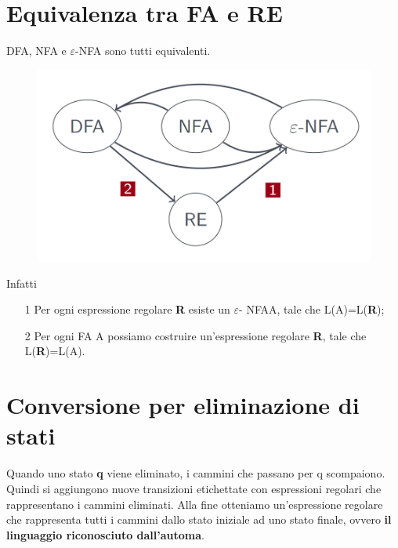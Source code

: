 \section{Equivalenza tra FA e RE}
DFA, NFA e $\varepsilon$\textrm{-NFA} sono tutti equivalenti.

\begin{figure}[h]
\centering 
\includegraphics[scale=0.5]{Immagini/equivalenza3.png}
\end{figure}

Infatti 
\begin{itemize}
\item[1] Per ogni espressione regolare \textbf{R} esiste un $\varepsilon$\textrm{-
NFA}A, tale che L(A)=L(\textbf{R});
\item[2] Per ogni FA A possiamo costruire un'espressione regolare \textbf{R},
tale che L(\textbf{R})=L(A).
\end{itemize}

\section{Conversione per eliminazione di stati}
Quando uno stato \textbf{q} viene eliminato, i cammini che passano per q scompaiono.
Quindi si aggiungono nuove transizioni etichettate con espressioni regolari che 
rappresentano i cammini eliminati. Alla fine otteniamo un'espressione regolare che
rappresenta tutti i cammini dallo stato iniziale ad uno stato finale, ovvero
\textbf{il linguaggio riconosciuto dall'automa}.






